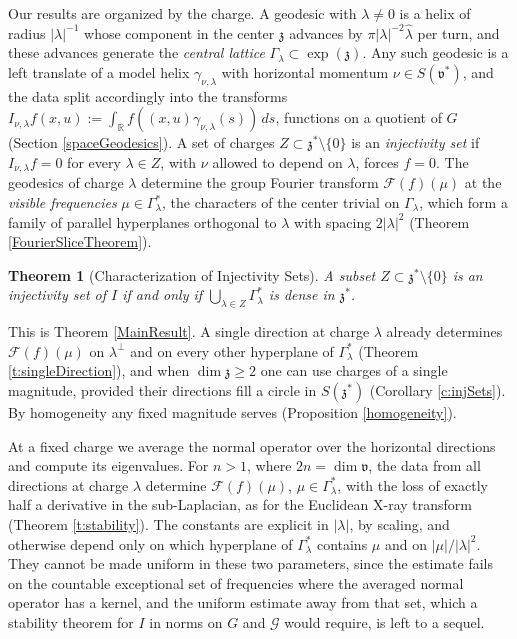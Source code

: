 \documentclass[11pt]{amsart}
\theoremstyle{plain}
\newtheorem*{theorem*}{Theorem}
\theoremstyle{definition}
\theoremstyle{remark}
\numberwithin{equation}{section}
\def\fz{\mathfrak{z}}
\def\fv{\mathfrak{v}}
\def\cG{\mathcal{G}}
\def\cF{\mathcal{F}}
\def\mz{\setminus\{0\}}
\def\R{{\mathbb R}}%
\numberwithin{equation}{section}
\begin{document}
Our results are organized by the charge. A geodesic with $\lambda\neq0$ is a helix of radius $|\lambda|^{-1}$ whose component in the center $\fz$ advances by $\pi|\lambda|^{-2}\hat\lambda$ per turn, and these advances generate the \textit{central lattice} $\Gamma_\lambda\subset\exp(\fz)$. Any such geodesic is a left translate of a model helix $\gamma_{\nu, \lambda}$ with horizontal momentum $\nu\in S(\fv^*)$, and the data split accordingly into the transforms $I_{\nu, \lambda}f(x, u):=\int_\R f((x, u)\gamma_{\nu, \lambda}(s))\,ds$, functions on a quotient of $G$ (Section \ref{spaceGeodesics}). A set of charges $Z\subset\fz^*\mz$ is an \textit{injectivity set} if $I_{\nu, \lambda}f=0$ for every $\lambda\in Z$, with $\nu$ allowed to depend on $\lambda$, forces $f=0$. The geodesics of charge $\lambda$ determine the group Fourier transform $\cF(f)(\mu)$ at the \textit{visible frequencies} $\mu\in \Gamma_\lambda^*$, the characters of the center trivial on $\Gamma_\lambda$, which form a family of parallel hyperplanes orthogonal to $\lambda$ with spacing $2|\lambda|^2$ (Theorem \ref{FourierSliceTheorem}).
\begin{theorem*}[Characterization of Injectivity Sets]
	A subset $Z\subset \fz^*\mz$ is an injectivity set of $I$ if and only if $\bigcup_{\lambda\in Z}\Gamma_\lambda^*$ is dense in $\fz^*$.
\end{theorem*}
This is Theorem \ref{MainResult}. A single direction at charge $\lambda$ already determines $\cF(f)(\mu)$ on $\lambda^\perp$ and on every other hyperplane of $\Gamma_\lambda^*$ (Theorem \ref{t:singleDirection}), and when $\dim\fz\geq2$ one can use charges of a single magnitude, provided their directions fill a circle in $S(\fz^*)$ (Corollary \ref{c:injSets}). By homogeneity any fixed magnitude serves (Proposition \ref{homogeneity}).

At a fixed charge we average the normal operator over the horizontal directions and compute its eigenvalues. For $n>1$, where $2n=\dim\fv$, the data from all directions at charge $\lambda$ determine $\cF(f)(\mu)$, $\mu\in \Gamma_\lambda^*$, with the loss of exactly half a derivative in the sub-Laplacian, as for the Euclidean X-ray transform \cite{strichartzLpEstimatesRadon1981} (Theorem \ref{t:stability}). The constants are explicit in $|\lambda|$, by scaling, and otherwise depend only on which hyperplane of $\Gamma_\lambda^*$ contains $\mu$ and on $|\mu|/|\lambda|^2$. They cannot be made uniform in these two parameters, since the estimate fails on the countable exceptional set of frequencies where the averaged normal operator has a kernel, and the uniform estimate away from that set, which a stability theorem for $I$ in norms on $G$ and $\cG$ would require, is left to a sequel.
\end{document}
